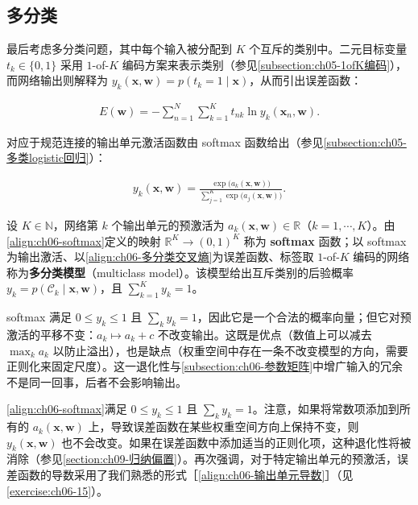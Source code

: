 \documentclass[../../main.tex]{subfiles}
\begin{document}
\subsection{多分类}\label{subsection:ch06-多分类}

最后考虑多分类问题，其中每个输入被分配到 $K$ 个互斥的类别中。二元目标变量 $t_k\in\{0,1\}$ 采用 $1$-of-$K$ 编码方案来表示类别（参见\cref{subsection:ch05-1ofK编码}），而网络输出则解释为 $y_k(\boldsymbol{x},\boldsymbol{w})=p(t_k=1\mid\boldsymbol{x})$，从而引出误差函数：

\begin{align}
E(\boldsymbol{w})=-\sum_{n=1}^{N}\sum_{k=1}^{K}t_{nk}\ln y_k(\boldsymbol{x}_n,\boldsymbol{w}).
\label{align:ch06-多分类交叉熵}
\end{align}

对应于规范连接的输出单元激活函数由 softmax 函数给出（参见\cref{subsection:ch05-多类logistic回归}）：

\begin{align}
y_k(\boldsymbol{x},\boldsymbol{w})=\frac{\exp\bigl(a_k(\boldsymbol{x},\boldsymbol{w})\bigr)}{\sum_{j=1}^{K}\exp\bigl(a_j(\boldsymbol{x},\boldsymbol{w})\bigr)}.
\label{align:ch06-softmax}
\end{align}

\begin{definition}\label{definition:ch06-softmax模型}
设 $K\in\mathbb{N}$，网络第 $k$ 个输出单元的预激活为 $a_{k}(\boldsymbol{x},\boldsymbol{w})\in\mathbb{R}$（$k=1,\cdots,K$）。由\eqref{align:ch06-softmax}定义的映射 $\mathbb{R}^{K}\to(0,1)^{K}$ 称为 \textbf{softmax} 函数；以 softmax 为输出激活、以\eqref{align:ch06-多分类交叉熵}为误差函数、标签取 $1$-of-$K$ 编码的网络称为\textbf{多分类模型}（multiclass model）。该模型给出互斥类别的后验概率 $y_{k}=p(\mathcal{C}_{k}\mid\boldsymbol{x},\boldsymbol{w})$，且 $\sum_{k=1}^{K}y_{k}=1$。
\end{definition}

\begin{remark}softmax 满足 $0\leqslant y_k\leqslant1$ 且 $\sum_ky_k=1$，因此它是一个合法的概率向量；但它对预激活的平移不变：$a_k\mapsto a_k+c$ 不改变输出。这既是优点（数值上可以减去 $\max_ka_k$ 以防止溢出），也是缺点（权重空间中存在一条不改变模型的方向，需要正则化来固定尺度）。这一退化性与\cref{subsection:ch06-参数矩阵}中增广输入的冗余不是同一回事，后者不会影响输出。
\end{remark}

\eqref{align:ch06-softmax}满足 $0\leqslant y_k\leqslant1$ 且 $\sum_ky_k=1$。注意，如果将常数项添加到所有的 $a_k(\boldsymbol{x},\boldsymbol{w})$ 上，导致误差函数在某些权重空间方向上保持不变，则 $y_k(\boldsymbol{x},\boldsymbol{w})$ 也不会改变。如果在误差函数中添加适当的正则化项，这种退化性将被消除（参见\cref{section:ch09-归纳偏置}）。再次强调，对于特定输出单元的预激活，误差函数的导数采用了我们熟悉的形式［\eqref{align:ch06-输出单元导数}］（见\cref{exercise:ch06-15}）。
\end{document}

